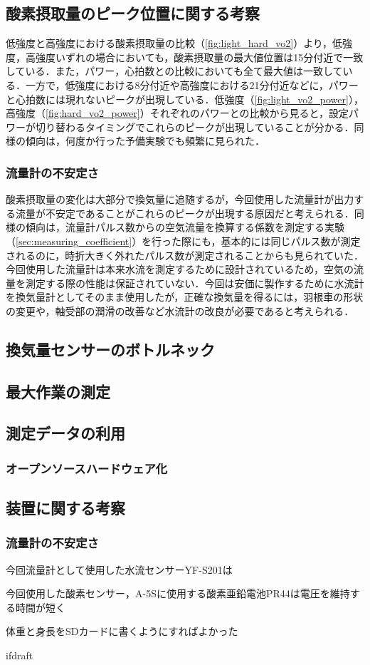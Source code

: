 \subsection{酸素摂取量のピーク位置に関する考察}

低強度と高強度における酸素摂取量の比較（\ref{fig:light_hard_vo2}）より，低強度，高強度いずれの場合においても，酸素摂取量の最大値位置は15分付近で一致している．また，パワー，心拍数との比較においても全て最大値は一致している．一方で，低強度における8分付近や高強度における21分付近などに，パワーと心拍数には現れないピークが出現している．低強度（\ref{fig:light_vo2_power}），高強度（\ref{fig:hard_vo2_power}）それぞれのパワーとの比較から見ると，設定パワーが切り替わるタイミングでこれらのピークが出現していることが分かる．同様の傾向は，何度か行った予備実験でも頻繁に見られた．

\subsubsection{流量計の不安定さ}

酸素摂取量の変化は大部分で換気量に追随するが，今回使用した流量計が出力する流量が不安定であることがこれらのピークが出現する原因だと考えられる．同様の傾向は，流量計パルス数からの空気流量を換算する係数を測定する実験（\ref{sec:measuring_coefficient}）を行った際にも，基本的には同じパルス数が測定されるのに，時折大きく外れたパルス数が測定されることからも見られていた．今回使用した流量計は本来水流を測定するために設計されているため，空気の流量を測定する際の性能は保証されていない．今回は安価に製作するために水流計を換気量計としてそのまま使用したが，正確な換気量を得るには，羽根車の形状の変更や，軸受部の潤滑の改善など水流計の改良が必要であると考えられる．

\subsection{換気量センサーのボトルネック}

\subsection{最大作業の測定}



\subsection{測定データの利用}

\subsubsection{オープンソースハードウェア化}

\subsection{装置に関する考察}

\subsubsection{流量計の不安定さ}

今回流量計として使用した水流センサーYF-S201は

今回使用した酸素センサー，A-5Sに使用する酸素亜鉛電池PR44は電圧を維持する時間が短く

体重と身長をSDカードに書くようにすればよかった

\expandafter\ifx\csname ifdraft\endcsname\relax
  
\fi
